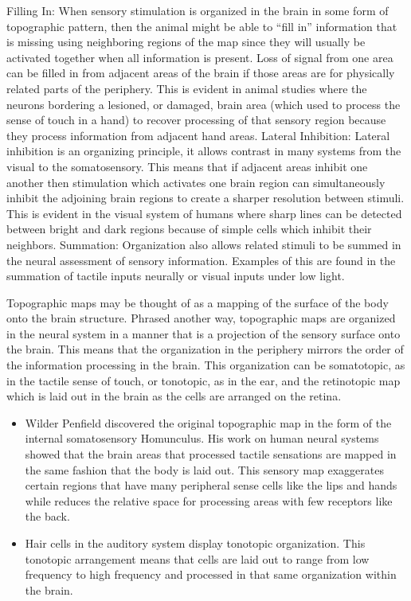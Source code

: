 Filling In: When sensory stimulation is organized in the brain in some form of topographic pattern, then the animal might be able to ``fill in'' information that is missing using neighboring regions of the map since they will usually be activated together when all information is present. Loss of signal from one area can be filled in from adjacent areas of the brain if those areas are for physically related parts of the periphery. This is evident in animal studies where the neurons bordering a lesioned, or damaged, brain area (which used to process the sense of touch in a hand) to recover processing of that sensory region because they process information from adjacent hand areas.
Lateral Inhibition: Lateral inhibition is an organizing principle, it allows contrast in many systems from the visual to the somatosensory. This means that if adjacent areas inhibit one another then stimulation which activates one brain region can simultaneously inhibit the adjoining brain regions to create a sharper resolution between stimuli. This is evident in the visual system of humans where sharp lines can be detected between bright and dark regions because of simple cells which inhibit their neighbors.
Summation: Organization also allows related stimuli to be summed in the neural assessment of sensory information. Examples of this are found in the summation of tactile inputs neurally or visual inputs under low light.

Topographic maps may be thought of as a mapping of the surface of the body onto the brain structure. Phrased another way, topographic maps are organized in the neural system in a manner that is a projection of the sensory surface onto the brain. This means that the organization in the periphery mirrors the order of the information processing in the brain. This organization can be somatotopic, as in the tactile sense of touch, or tonotopic, as in the ear, and the retinotopic map which is laid out in the brain as the cells are arranged on the retina.

\begin{itemize}
\tightlist
\item
  Wilder Penfield discovered the original topographic map in the form of the internal somatosensory Homunculus. His work on human neural systems showed that the brain areas that processed tactile sensations are mapped in the same fashion that the body is laid out. This sensory map exaggerates certain regions that have many peripheral sense cells like the lips and hands while reduces the relative space for processing areas with few receptors like the back.
\item
  Hair cells in the auditory system display tonotopic organization. This tonotopic arrangement means that cells are laid out to range from low frequency to high frequency and processed in that same organization within the brain.
\end{itemize}

